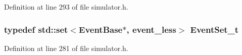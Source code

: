 Definition at line 293 of file simulator.h.
\subsubsection[{EventSet\_\-t}]{\setlength{\rightskip}{0pt plus 5cm}typedef std::set$<${\bf EventBase}$\ast$, {\bf event\_\-less}$>$ {\bf EventSet\_\-t}}\label{simulator_8h_3c276bab52587098dc0bd9e0e115e5bc}




Definition at line 281 of file simulator.h.
